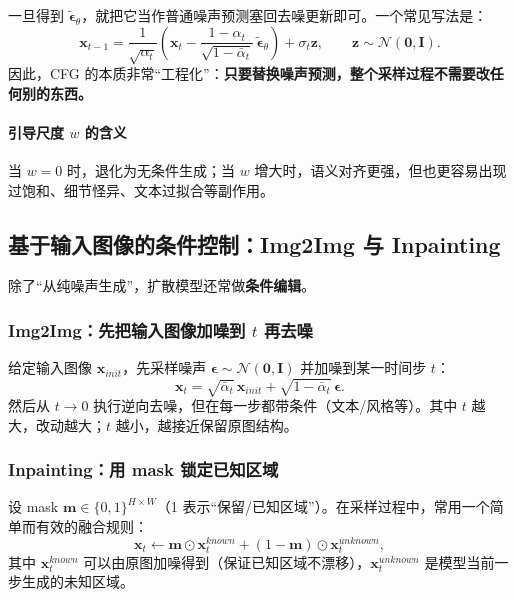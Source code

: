 \documentclass[zihao=-4, fontset=windows]{ctexart}
\begin{document}
一旦得到 $\tilde{\boldsymbol\epsilon}_\theta$，就把它当作普通噪声预测塞回去噪更新即可。一个常见写法是：
\begin{equation}
    \mathbf{x}_{t-1}=\frac{1}{\sqrt{\alpha_t}}\left(\mathbf{x}_t-\frac{1-\alpha_t}{\sqrt{1-\bar\alpha_t}}\,\tilde{\boldsymbol\epsilon}_\theta\right)+\sigma_t\mathbf{z},\qquad \mathbf{z}\sim\mathcal{N}(\mathbf{0},\mathbf{I}).
\end{equation}
因此，CFG 的本质非常“工程化”：\textbf{只要替换噪声预测，整个采样过程不需要改任何别的东西。}

\paragraph{引导尺度 $w$ 的含义}
当 $w=0$ 时，退化为无条件生成；当 $w$ 增大时，语义对齐更强，但也更容易出现过饱和、细节怪异、文本过拟合等副作用。

\subsection{基于输入图像的条件控制：Img2Img 与 Inpainting}

除了“从纯噪声生成”，扩散模型还常做\textbf{条件编辑}。

\subsubsection{Img2Img：先把输入图像加噪到 $t$ 再去噪}
给定输入图像 $\mathbf{x}_{init}$，先采样噪声 $\boldsymbol\epsilon\sim\mathcal{N}(\mathbf{0},\mathbf{I})$ 并加噪到某一时间步 $t$：
\begin{equation}
    \mathbf{x}_t=\sqrt{\bar\alpha_t}\,\mathbf{x}_{init}+\sqrt{1-\bar\alpha_t}\,\boldsymbol\epsilon.
\end{equation}
然后从 $t\to 0$ 执行逆向去噪，但在每一步都带条件（文本/风格等）。其中 $t$ 越大，改动越大；$t$ 越小，越接近保留原图结构。

\subsubsection{Inpainting：用 mask 锁定已知区域}
设 mask $\mathbf{m}\in\{0,1\}^{H\times W}$（1 表示“保留/已知区域”）。在采样过程中，常用一个简单而有效的融合规则：
\begin{equation}
    \mathbf{x}_t \leftarrow \mathbf{m}\odot \mathbf{x}_t^{known} + (1-\mathbf{m})\odot \mathbf{x}_t^{unknown},
\end{equation}
其中 $\mathbf{x}_t^{known}$ 可以由原图加噪得到（保证已知区域不漂移），$\mathbf{x}_t^{unknown}$ 是模型当前一步生成的未知区域。
\end{document}
